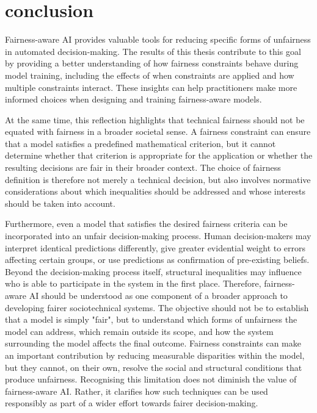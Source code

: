\section{conclusion}
Fairness-aware AI provides valuable tools for reducing specific forms of unfairness in automated decision-making. The results of this thesis contribute to this goal by providing a better understanding of how fairness constraints behave during model training, including the effects of when constraints are applied and how multiple constraints interact. These insights can help practitioners make more informed choices when designing and training fairness-aware models.

At the same time, this reflection highlights that technical fairness should not be equated with fairness in a broader societal sense. A fairness constraint can ensure that a model satisfies a predefined mathematical criterion, but it cannot determine whether that criterion is appropriate for the application or whether the resulting decisions are fair in their broader context. The choice of fairness definition is therefore not merely a technical decision, but also involves normative considerations about which inequalities should be addressed and whose interests should be taken into account.

Furthermore, even a model that satisfies the desired fairness criteria can be incorporated into an unfair decision-making process. Human decision-makers may interpret identical predictions differently, give greater evidential weight to errors affecting certain groups, or use predictions as confirmation of pre-existing beliefs. Beyond the decision-making process itself, structural inequalities may influence who is able to participate in the system in the first place. Therefore, fairness-aware AI should be understood as one component of a broader approach to developing fairer sociotechnical systems. The objective should not be to establish that a model is simply "fair", but to understand which forms of unfairness the model can address, which remain outside its scope, and how the system surrounding the model affects the final outcome. Fairness constraints can make an important contribution by reducing measurable disparities within the model, but they cannot, on their own, resolve the social and structural conditions that produce unfairness. Recognising this limitation does not diminish the value of fairness-aware AI. Rather, it clarifies how such techniques can be used responsibly as part of a wider effort towards fairer decision-making.

